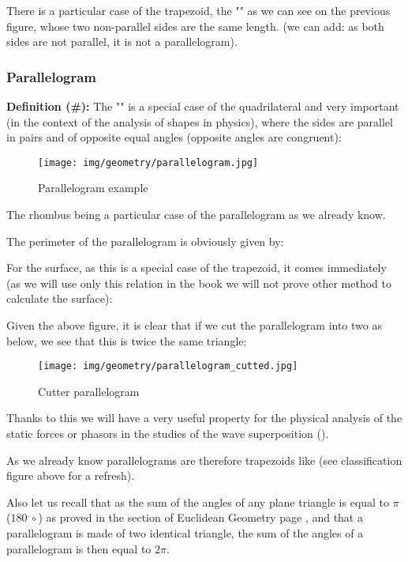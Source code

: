 {	\begin{tcolorbox}[title=Remark,colframe=black,arc=10pt]
	There is a particular case of the trapezoid, the "" as we can see on the previous figure, whose two non-parallel sides are the same length. (we can add: as both sides are not parallel, it is not a parallelogram).
	\end{tcolorbox}
	
	\subsubsection{Parallelogram}\label{parallelogram}
	\textbf{Definition (\#\mydef):} The "" is a special case of the quadrilateral and very important (in the context of the analysis of shapes in physics), where the sides are parallel in pairs and of opposite equal angles (opposite angles are congruent):
	\begin{figure}[H]
		\centering
		\texttt{[image: img/geometry/parallelogram.jpg]}
		\caption{Parallelogram example}
	\end{figure}
	The rhombus being a particular case of the parallelogram as we already know.
	
	The perimeter of the parallelogram is obviously given by:
	
	For the surface, as this is a special case of the trapezoid, it comes immediately (as we will use only this relation in the book we will not prove other method to calculate the surface):
	
	Given the above figure, it is clear that if we cut the parallelogram into two as below, we see that this is twice the same triangle:
	\begin{figure}[H]
		\centering
		\texttt{[image: img/geometry/parallelogram\_cutted.jpg]}
		\caption{Cutter parallelogram}
	\end{figure}
	Thanks to this we will have a very useful property for the physical analysis of the static forces or phasors in the studies of the wave superposition ().
	
	\begin{tcolorbox}[title=Remark,colframe=black,arc=10pt]
	As we already know parallelograms are therefore trapezoids like (see classification figure above for a refresh).
	\end{tcolorbox}	
	Also let us recall that as  the sum of the angles of any plane triangle is equal to $\pi$ ($180^.\circ$) as proved in the section of Euclidean Geometry page \pageref{angle sum theorem}, and that a parallelogram is made of two identical triangle, the sum of the angles of a parallelogram is then equal to $2\pi$.
	
}
